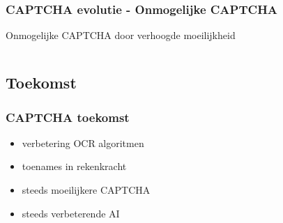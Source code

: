 \documentclass{beamer}
\begin{document}
\begin{frame}
  \frametitle{CAPTCHA evolutie - Onmogelijke CAPTCHA}
  Onmogelijke CAPTCHA door verhoogde moeilijkheid
  \begin{columns}[c]
       \begin{center}
      \end{center}
     \begin{center}
      \end{center}
  \end{columns}
\end{frame}
\subsection{Toekomst}
\begin{frame}
  \frametitle{CAPTCHA toekomst}
  \begin{itemize}
    \item<+-> verbetering OCR algoritmen
    \item<+-> toenames in rekenkracht
  \end{itemize}
  \vfill  
  \begin{itemize}
    \item<+-> steeds moeilijkere CAPTCHA
    \item<+-> steeds verbeterende AI
  \end{itemize}
\end{frame}
\end{document}
